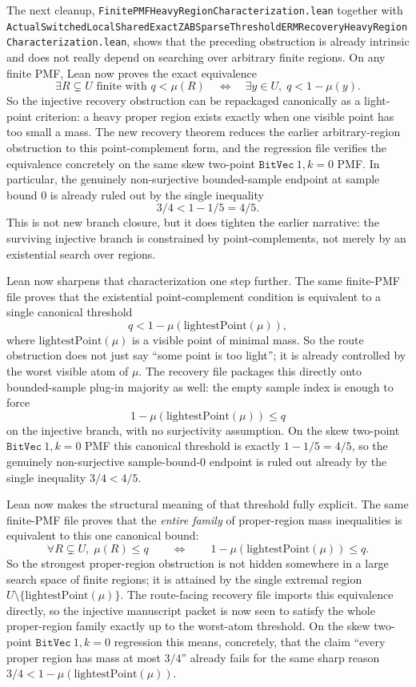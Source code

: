 \documentclass[11pt]{article}
\theoremstyle{remark}
\begin{document}
The next cleanup,
\texttt{FinitePMFHeavyRegionCharacterization.lean} together with
\texttt{ActualSwitchedLocalSharedExactZABSparseThresholdERMRecoveryHeavyRegionCharacterization.lean},
shows that the preceding obstruction is already intrinsic and does not really
depend on searching over arbitrary finite regions.  On any finite PMF, Lean now
proves the exact equivalence
\[
  \exists R \subsetneq U \text{ finite with } q < \mu(R)
  \quad\Longleftrightarrow\quad
  \exists y \in U,\; q < 1 - \mu(y).
\]
So the injective recovery obstruction can be repackaged canonically as a
light-point criterion: a heavy proper region exists exactly when one visible
point has too small a mass.  The new recovery theorem reduces the earlier
arbitrary-region obstruction to this point-complement form, and the regression
file verifies the equivalence concretely on the same skew two-point
\(\texttt{BitVec}\ 1, k=0\) PMF.  In particular, the genuinely non-surjective
bounded-sample endpoint at sample bound \(0\) is already ruled out by the
single inequality
\[
  3/4 < 1 - 1/5 = 4/5.
\]
This is not new branch closure, but it does tighten the earlier narrative:
the surviving injective branch is constrained by point-complements, not merely
by an existential search over regions.

Lean now sharpens that characterization one step further.  The same finite-PMF
file proves that the existential point-complement condition is equivalent to a
single canonical threshold
\[
  q < 1 - \mu(\mathrm{lightestPoint}(\mu)),
\]
where \(\mathrm{lightestPoint}(\mu)\) is a visible point of minimal mass.
So the route obstruction does not just say ``some point is too light''; it is
already controlled by the worst visible atom of \(\mu\).  The recovery file
packages this directly onto bounded-sample plug-in majority as well: the empty
sample index is enough to force
\[
  1 - \mu(\mathrm{lightestPoint}(\mu)) \le q
\]
on the injective branch, with no surjectivity assumption.  On the skew
two-point \(\texttt{BitVec}\ 1, k=0\) PMF this canonical threshold is exactly
\(1 - 1/5 = 4/5\), so the genuinely non-surjective sample-bound-\(0\) endpoint
is ruled out already by the single inequality \(3/4 < 4/5\).

Lean now makes the structural meaning of that threshold fully explicit.  The
same finite-PMF file proves that the \emph{entire family} of proper-region
mass inequalities is equivalent to this one canonical bound:
\[
  \forall R \subsetneq U,\; \mu(R) \le q
  \qquad\Longleftrightarrow\qquad
  1 - \mu(\mathrm{lightestPoint}(\mu)) \le q.
\]
So the strongest proper-region obstruction is not hidden somewhere in a large
search space of finite regions; it is attained by the single extremal region
\(U \setminus \{\mathrm{lightestPoint}(\mu)\}\).  The route-facing recovery
file imports this equivalence directly, so the injective manuscript packet is
now seen to satisfy the whole proper-region family exactly up to the worst-atom
threshold.  On the skew two-point \(\texttt{BitVec}\ 1, k=0\) regression this
means, concretely, that the claim ``every proper region has mass at most
\(3/4\)'' already fails for the same sharp reason \(3/4 < 1 -
\mu(\mathrm{lightestPoint}(\mu))\).
\end{document}
